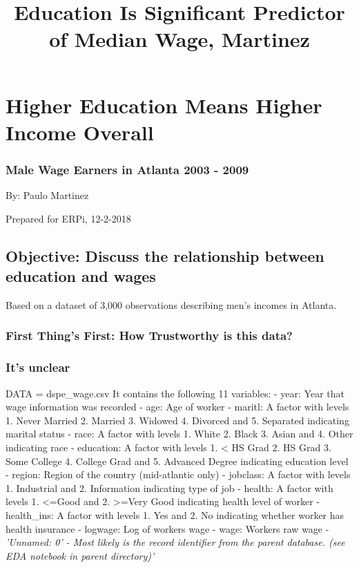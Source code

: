 \documentclass[11pt]{article}
\title{Education Is Significant Predictor of Median Wage, Martinez}
\begin{document}
    
    
    \maketitle
    
    

    
    \section{Higher Education Means Higher Income
Overall}\label{higher-education-means-higher-income-overall}

\subsubsection{Male Wage Earners in Atlanta 2003 -
2009}\label{male-wage-earners-in-atlanta-2003---2009}

By: Paulo Martinez

Prepared for ERPi, 12-2-2018

\subsection{Objective: Discuss the relationship between education and
wages}\label{objective-discuss-the-relationship-between-education-and-wages}

Based on a dataset of 3,000 observations describing men's incomes in
Atlanta.

    \subsubsection{First Thing's First: How Trustworthy is this
data?}\label{first-things-first-how-trustworthy-is-this-data}

\subsubsection{It's unclear}\label{its-unclear}

DATA = dspe\_wage.csv It contains the following 11 variables: - year:
Year that wage information was recorded - age: Age of worker - maritl: A
factor with levels 1. Never Married 2. Married 3. Widowed 4. Divorced
and 5. Separated indicating marital status - race: A factor with levels
1. White 2. Black 3. Asian and 4. Other indicating race - education: A
factor with levels 1. \textless{} HS Grad 2. HS Grad 3. Some College 4.
College Grad and 5. Advanced Degree indicating education level - region:
Region of the country (mid-atlantic only) - jobclass: A factor with
levels 1. Industrial and 2. Information indicating type of job - health:
A factor with levels 1. \textless{}=Good and 2. \textgreater{}=Very Good
indicating health level of worker - health\_ins: A factor with levels 1.
Yes and 2. No indicating whether worker has health insurance - logwage:
Log of workers wage - wage: Workers raw wage - \emph{'Unnamed: 0' - Most
likely is the record identifier from the parent database. (see EDA
notebook in parent directory)'}
\end{document}
